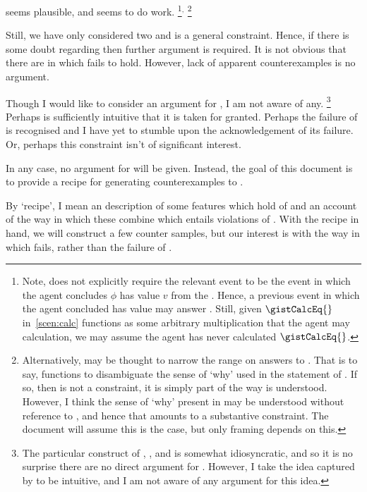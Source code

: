 \begin{note}
  \issueInclusion{} seems plausible, and seems to do work.%
  \footnote{
    Note, \qHow{} does not explicitly require the relevant event to be the event in which the agent concludes \(\phi\) has value \(v\) from the \pool{}.
    Hence, a previous event in which the agent concluded \propM{\gistCalcEq{}} has value  may answer \qHow{}.
    Still, given \(\gistCalcEq{}\) in~\autoref{scen:calc} functions as some arbitrary multiplication that the agent may calculation, we may assume the agent has never calculated \(\gistCalcEq{}\).
  }\(^{,}\)%
  \footnote{
    Alternatively, \issueInclusion{} may be thought to narrow the range on answers to \qWhy{}.
    That is to say, \issueInclusion{} functions to disambiguate the sense of `why' used in the statement of \qWhy{}.
    If so, then \issueInclusion{} is not a constraint, it is simply part of the way \qWhy{} is understood.
    However, I think the sense of `why' present in \qWhy{} may be understood without reference to \issueInclusion{}, and hence that \issueInclusion{} amounts to a substantive constraint.
    The document will assume this is the case, but only framing depends on this.
  }

  Still, we have only considered two  and \issueInclusion{} is a general constraint.
  Hence, if there is some doubt regarding \issueInclusion{} then further argument is required.
  It is not obvious that there are  in which \issueInclusion{} fails to hold.
  However, lack of apparent counterexamples is no argument.

  Though I would like to consider an argument for \issueInclusion{}, I am not aware of any.%
  \footnote{
    The particular construct of \qWhy{}, \qHow{}, and \issueInclusion{} is somewhat idiosyncratic, and so it is no surprise there are no direct argument for \issueInclusion{}.
    However, I take the idea captured by \issueInclusion{} to be intuitive, and I am not aware of any argument for this idea.
  }
  Perhaps \issueInclusion{} is sufficiently intuitive that it is taken for granted.
  Perhaps the failure of \issueInclusion{} is recognised and I have yet to stumble upon the acknowledgement of its failure.
  Or, perhaps this constraint isn't of significant interest.

  In any case, no argument for \issueInclusion{} will be given.
  Instead, the goal of this document is to provide a recipe for generating counterexamples to \issueInclusion{}.

  By `recipe', I mean an description of some features which hold of  and an account of the way in which these combine which entails violations of \issueInclusion{}.
  With the recipe in hand, we will construct a few counter samples, but our interest is with the way in which \issueInclusion{} fails, rather than the failure of \issueInclusion{}.


\end{note}
